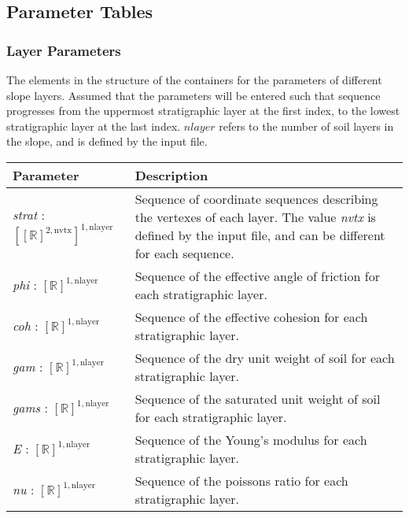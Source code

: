 \documentclass[12pt]{article}
\begin{document}
\subsection{Parameter Tables} \label{sec:ParamTables}

\subsubsection{Layer Parameters} \label{Tbl:LayerParam}
\noindent
The elements in the structure of the containers for the parameters of
different slope layers. Assumed that the parameters will be entered
such that sequence progresses from the uppermost stratigraphic layer
at the first index, to the lowest stratigraphic layer at the last
index. $nlayer$ refers to the number of soil layers in the slope, and
is defined by the input file.

\begin{center}
\begin{longtable}{ p{}
    p{}}\hline

  \textbf{Parameter} & \textbf{Description}\\ \hline

  \textit{strat} : $[[\mathbb{R}]^{2,\text{nvtx}}]^{1,\text{nlayer}}$
  & Sequence of coordinate sequences describing the vertexes of each
  layer. The value \textit{nvtx} is defined by the input file, and can
  be different for each sequence.\\

  \textit{phi} : $[\mathbb{R}]^{1,\text{nlayer}}$ & Sequence of the
  effective angle of friction for each stratigraphic layer.\\

  \textit{coh} : $[\mathbb{R}]^{1,\text{nlayer}}$ & Sequence of the
  effective cohesion for each stratigraphic layer.\\

  \textit{gam} : $[\mathbb{R}]^{1,\text{nlayer}}$ & Sequence of the dry
  unit weight of soil for each stratigraphic layer.\\

  \textit{gams} : $[\mathbb{R}]^{1,\text{nlayer}}$ & Sequence of the
  saturated unit weight of soil for each stratigraphic layer.\\

  \textit{E} : $[\mathbb{R}]^{1,\text{nlayer}}$ & Sequence of the
  Young's modulus for each stratigraphic layer.\\

  \textit{nu} : $[\mathbb{R}]^{1,\text{nlayer}}$ & Sequence of the
  poissons ratio for each stratigraphic layer. \\ \hline
\end{longtable}
\end{center}
\end{document}
